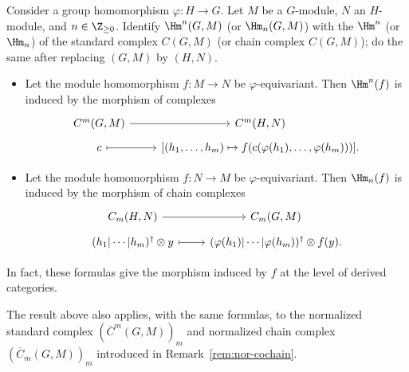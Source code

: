 \begin{proposition}\label{prop:grp-equiv}
	Consider a group homomorphism $\varphi:H\to G$. Let $M$ be a $G$-module,
	$N$ an $H$-module, and $n\in\Z_{\geq0}$. Identify $\Hm^n(G,M)$ (or
	$\Hm_n(G,M)$) with the $\Hm^n$ (or $\Hm_n$) of the standard complex
	$C(G,M)$ (or chain complex $C(G,M)$); do the same after replacing
	$(G,M)$ by $(H,N)$.

	\begin{itemize}
		\item Let the module homomorphism $f:M\to N$ be
		$\varphi$-equivariant. Then $\Hm^n(f)$ is induced by the morphism of
		complexes
		\[\begin{tikzcd}[row sep=tiny]
			C^m(G, M) \arrow[r] & C^m(H, N) \\
			c \arrow[mapsto, r] & {\left[ (h_1, \ldots, h_m) \mapsto f(c(\varphi(h_1), \ldots, \varphi(h_m))) \right]}.
		\end{tikzcd}\]
		\item Let the module homomorphism $f:N\to M$ be
		$\varphi$-equivariant. Then $\Hm_n(f)$ is induced by the morphism of
		chain complexes
		\[\begin{tikzcd}[row sep=tiny]
			C_m(H, N) \arrow[r] & C_m(G, M) \\
			(h_1 | \cdots | h_m)^\dagger \otimes y \arrow[mapsto, r] & (\varphi(h_1) | \cdots | \varphi(h_m))^\dagger \otimes f(y).
		\end{tikzcd}\]
	\end{itemize}
	In fact, these formulas give the morphism induced by $f$ at the level of
	derived categories.

	The result above also applies, with the same formulas, to the normalized
	standard complex $(\overline{C}^m(G,M))_m$ and normalized chain complex
	$(\overline{C}_m(G,M))_m$ introduced in
	Remark~\ref{rem:nor-cochain}.
\end{proposition}
